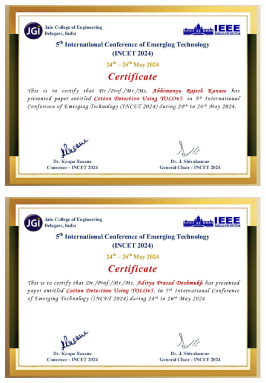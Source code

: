 \documentclass[12pt,a4paper]{report}
\begin{document}
\begin{figure}[!htb]
\begin{center}
\includegraphics[scale=0.5]{images/certificates/certificates/1477_Abhimanyu Rajesh Kanase_page-0001.jpg}
\end{center}
\end{figure}
\begin{figure}[!htb]
\begin{center}
\includegraphics[scale=0.5]{images/certificates/certificates/1477_Aditya Prasad Deshmukh-1_page-0001.jpg}
\end{center}
\end{figure} 
\end{document}

